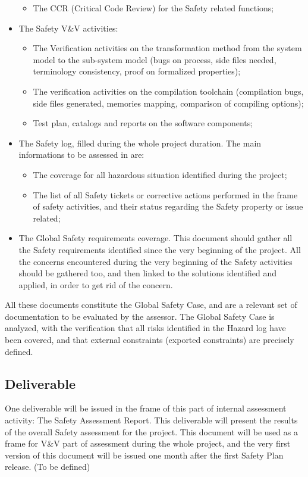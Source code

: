 \documentclass{template/openetcs_article}
\begin{document}
\begin{itemize}
\begin{itemize}
	\item The CCR (Critical Code Review) for the Safety related functions;
	\end{itemize}
\item The Safety V\&V activities:
	\begin{itemize}
	\item The Verification activities on the transformation method from the system model to the sub-system model (bugs on process, side files needed, terminology consistency, proof on formalized properties);
	\item The verification activities on the compilation toolchain (compilation bugs, side files generated, memories mapping, comparison of compiling options);
	\item Test plan, catalogs and reports on the software components;
	\end{itemize}
\item The Safety log, filled during the whole project duration. The main informations to be assessed in are:
	\begin{itemize}
	\item The coverage for all hazardous situation identified during the project;
	\item The list of all Safety tickets or corrective actions performed in the frame of safety activities, and their status regarding the Safety property or issue related;
	\end{itemize}
\item The Global Safety requirements coverage. This document should gather all the Safety requirements identified since the very beginning of the project. All the concerns encountered during the very beginning of the Safety activities should be gathered too, and then linked to the solutions identified and applied, in order to get rid of the concern.
\end{itemize}

All these documents constitute the Global Safety Case, and are a relevant set of documentation to be evaluated by the assessor. The Global Safety Case is analyzed, with the verification that all risks identified in the Hazard log have been covered, and that external constraints (exported constraints) are precisely defined.


\subsection{Deliverable}
One deliverable will be issued in the frame of this part of internal assessment activity: The Safety Assessment Report. This deliverable will present the results of the overall Safety assessment for the project.
This document will be used as a frame for V\&V part of assessment during the whole project, and the very first version of this document will be issued one month after the first Safety Plan release. (To be defined)
\end{document}
